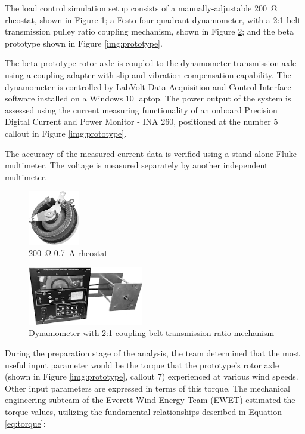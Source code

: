 \documentclass[11pt,letterpaper,conference]{IEEEtran}
\begin{document}
The load control simulation setup consists of a manually-adjustable
\qty{200}{\ohm} rheostat, shown in Figure \ref{img:rheostat}; a Festo four
quadrant dynamometer, with a 2:1 belt transmission pulley ratio coupling
mechanism, shown in Figure \ref{img:dyno}; and the beta prototype shown in
Figure \ref{img:prototype}.

The beta prototype rotor axle is coupled to the dynamometer transmission
axle using a coupling adapter with slip and vibration compensation
capability. The dynamometer is controlled by LabVolt Data Acquisition and
Control Interface software installed on a Windows 10 laptop. The power output
of the system is assessed using the current measuring functionality of an
onboard Precision Digital Current and Power Monitor - INA 260, positioned
at the number 5 callout in Figure \ref{img:prototype}.

The accuracy of the measured current data is verified using a stand-alone Fluke
multimeter. The voltage is measured separately by another independent
multimeter.

\begin{figure}[th]
    \centering
    \includegraphics[width=0.2\textwidth]{images/rheostat.png}
    \caption{\qty{200}{\ohm} \qty{0.7}{\A} rheostat}
    \label{img:rheostat}
\end{figure}
\begin{figure}[th]
    \centering
    \includegraphics[width=0.45\textwidth]{images/dyno.png}
    \caption{Dynamometer with 2:1 coupling belt transmission ratio mechanism}
    \label{img:dyno}
\end{figure}

During the preparation stage of the analysis, the team determined that the most
useful input parameter would be the torque that the prototype's rotor axle
(shown in Figure \ref{img:prototype}, callout 7) experienced at various wind
speeds. Other input parameters are expressed in terms of this torque. The
mechanical engineering subteam of the Everett Wind Energy Team (EWET)
estimated the torque values, utilizing the fundamental relationships described
in Equation \eqref{eq:torque}:
\end{document}
